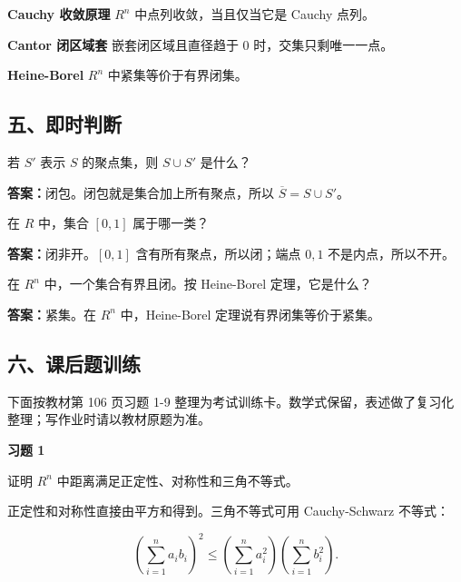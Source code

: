 \begin{conceptbox}
\textbf{Cauchy 收敛原理}
\(R^n\) 中点列收敛，当且仅当它是 Cauchy 点列。
\end{conceptbox}

\begin{conceptbox}
\textbf{Cantor 闭区域套}
嵌套闭区域且直径趋于 0 时，交集只剩唯一一点。
\end{conceptbox}

\begin{conceptbox}
\textbf{Heine-Borel}
\(R^n\) 中紧集等价于有界闭集。
\end{conceptbox}

\subsection*{五、即时判断}

\begin{quickcheck}
若 \(S'\) 表示 \(S\) 的聚点集，则 \(S\cup S'\) 是什么？

\tcblower
\textbf{答案：}闭包。闭包就是集合加上所有聚点，所以 \(\overline S=S\cup S'\)。
\end{quickcheck}

\begin{quickcheck}
在 \(R\) 中，集合 \([0,1]\) 属于哪一类？

\tcblower
\textbf{答案：}闭非开。\([0,1]\) 含有所有聚点，所以闭；端点 \(0,1\) 不是内点，所以不开。
\end{quickcheck}

\begin{quickcheck}
在 \(R^n\) 中，一个集合有界且闭。按 Heine-Borel 定理，它是什么？

\tcblower
\textbf{答案：}紧集。在 \(R^n\) 中，Heine-Borel 定理说有界闭集等价于紧集。
\end{quickcheck}

\subsection*{六、课后题训练}

下面按教材第 106 页习题 1-9 整理为考试训练卡。数学式保留，表述做了复习化整理；写作业时请以教材原题为准。

\begin{exercisebox}
\textbf{习题 1}

证明 \(R^n\) 中距离满足正定性、对称性和三角不等式。

\begin{hintbox}
正定性和对称性直接由平方和得到。三角不等式可用 Cauchy-Schwarz 不等式：

\[
          \left(\sum_{i=1}^{n}a_i b_i\right)^2
          \le \left(\sum_{i=1}^{n}a_i^2\right)\left(\sum_{i=1}^{n}b_i^2\right).
        \]
\end{hintbox}
\end{exercisebox}

